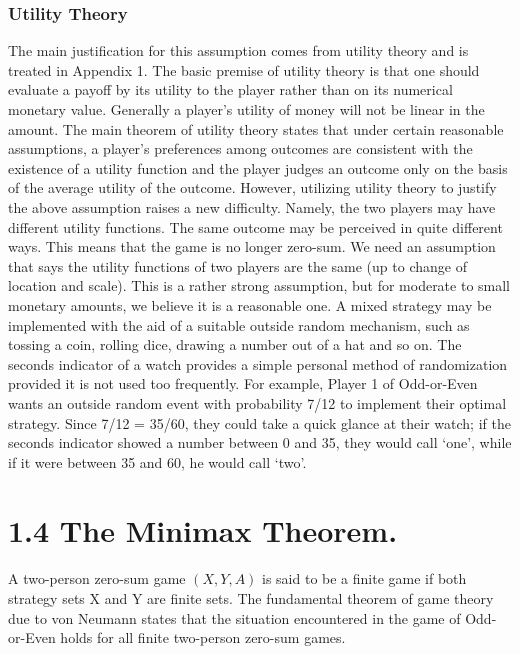 \documentclass[]{report}
\begin{document}
\subsubsection{Utility Theory}
The main justification for this assumption comes from utility theory and is treated
in Appendix 1. The basic premise of utility theory is that one should evaluate a payoff by
its utility to the player rather than on its numerical monetary value. Generally a player’s
utility of money will not be linear in the amount. The main theorem of utility theory
states that under certain reasonable assumptions, a player’s preferences among outcomes
are consistent with the existence of a utility function and the player judges an outcome
only on the basis of the average utility of the outcome.
However, utilizing utility theory to justify the above assumption raises a new difficulty.
Namely, the two players may have different utility functions. The same outcome may be
perceived in quite different ways. This means that the game is no longer zero-sum. We
need an assumption that says the utility functions of two players are the same (up to
change of location and scale). This is a rather strong assumption, but for moderate to
small monetary amounts, we believe it is a reasonable one.
A mixed strategy may be implemented with the aid of a suitable outside random
mechanism, such as tossing a coin, rolling dice, drawing a number out of a hat and so
on. The seconds indicator of a watch provides a simple personal method of randomization
provided it is not used too frequently. For example, Player 1 of Odd-or-Even wants an
outside random event with probability 7/12 to implement their optimal strategy. Since
7/12 = 35/60, they could take a quick glance at their watch; if the seconds indicator showed
a number between 0 and 35, they would call ‘one’, while if it were between 35 and 60, he
would call ‘two’.
\section{1.4 The Minimax Theorem.} A two-person zero-sum game $(X, Y, A)$ is said to be
a finite game if both strategy sets X and Y are finite sets. The fundamental theorem
of game theory due to von Neumann states that the situation encountered in the game of
Odd-or-Even holds for all finite two-person zero-sum games. 
\end{document}

